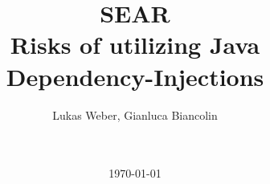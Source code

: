 \title{SEAR \\ Risks of utilizing Java Dependency-Injections}


\author{
    Lukas Weber, Gianluca Biancolin \\
    \\
    \\
}

\date{\today}

\maketitle

\thispagestyle{empty}

\clearpage